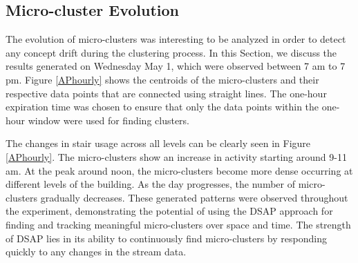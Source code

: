 \subsection{Micro-cluster Evolution}
 
The evolution of micro-clusters was interesting to be analyzed in order to detect any concept drift during the clustering process. In this Section, we discuss the results generated on Wednesday May 1, which were observed between 7 am to 7 pm. Figure \ref{APhourly} shows the centroids of the micro-clusters and their respective data points that are connected using straight lines. The one-hour expiration time was chosen to ensure that only the data points within the one-hour window were used for finding clusters. 

The changes in stair usage across all levels can be clearly seen in Figure \ref{APhourly}. The micro-clusters show an increase in activity starting around 9-11 am. At the peak around noon, the micro-clusters become more dense occurring at different levels of the building. As the day progresses, the number of micro-clusters gradually decreases. These generated patterns were observed throughout the experiment, demonstrating the potential of using the DSAP approach for finding and tracking meaningful micro-clusters over space and time. The strength of DSAP lies in its ability to continuously find micro-clusters by responding quickly to any changes in the stream data.

   
